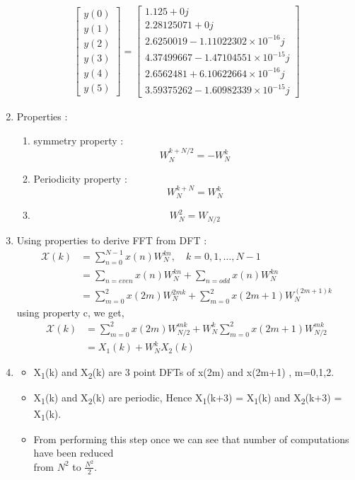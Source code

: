 \documentclass[journal,12pt,twocolumn]{IEEEtran}
\renewcommand\thesection{\arabic{section}}
\begin{document}
\begin{enumerate}[label=\thesection.\arabic*.,ref=\thesection.\theenumi]
\begin{align}
    \begin{bmatrix} 
y(0) \\ y(1) \\ y(2) \\ y(3) \\ y(4) \\ y(5) 
\end{bmatrix}
=
\begin{bmatrix}
1.125     +0j \\ 2.28125071+0j \\ 2.6250019 -1.11022302 \times 10^{-16}j \\ 4.37499667-1.47104551\times 10^{-15}j \\ 2.6562481 +6.10622664 \times 10^{-16}j \\ 3.59375262-1.60982339 \times 10^{-15}j 
\end{bmatrix}
\end{align}

\item
Properties :
\begin{enumerate}
    \item symmetry property : \[ W^{k+N/2}_{N} = - W^{k}_{N} \] 
    \item Periodicity property :  \[ W^{k+N}_{N} =  W^{k}_{N} \] 
    \item \[ W^{2}_{N} =  W_{N/2} \] 
\end{enumerate}
\item 
Using properties to derive FFT from DFT :
    \begin{align}
       \mathcal X(k) &=  \sum_{n=0}^{N-1} x(n)W^{kn}_{N}, \quad k=0,1, \ldots, N-1 \\
       &= \sum_{n=even} x(n)W^{kn}_{N} + \sum_{n=odd} x(n)W^{kn}_{N} \\
       &= \sum_{m=0}^{2} x(2m)W^{2mk}_{N} + \sum_{m=0}^{2} x(2m+1)W^{(2m+1)k}_{N} 
    \end{align}
using property c, we get,
    \begin{align}
        \mathcal X(k) &= \sum_{m=0}^{2} x(2m)W^{mk}_{N/2} + W^{k}_{N} \sum_{m=0}^{2} x(2m+1)W^{mk}_{N/2} \\
        &= X_{1}(k) + W^{k}_{N}X_{2}(k)
    \end{align}

\item
\begin{itemize}
    \item X\textsubscript{1}(k) and X\textsubscript{2}(k) are 3 point DFTs of x(2m) and x(2m+1) , m=0,1,2.
    \item X\textsubscript{1}(k) and X\textsubscript{2}(k) are periodic, Hence X\textsubscript{1}(k+3) = X\textsubscript{1}(k) and X\textsubscript{2}(k+3) = X\textsubscript{1}(k).
    \item From performing this step once we can see that number of computations have been reduced\\
    from $N^2$ to $\frac{N^2}{2}$.
\end{itemize}


\end{enumerate}
\end{document}
